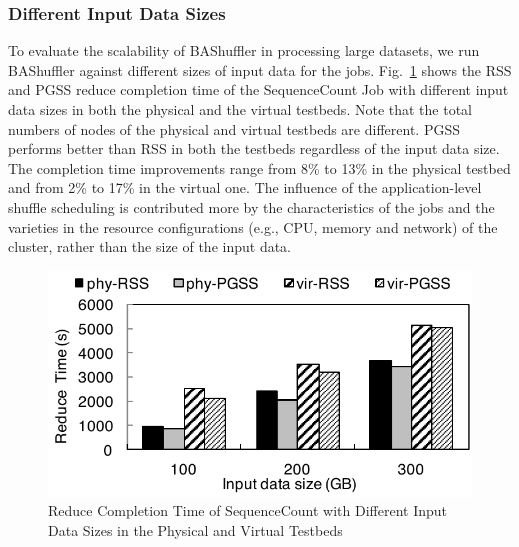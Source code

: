 \documentclass[10pt,journal,compsoc]{IEEEtran}
\begin{document}
\subsubsection{Different Input Data Sizes}
To evaluate the scalability of BAShuffler in processing large datasets, 
we run BAShuffler against different sizes of input data for the jobs.
Fig.~\ref{fig:r_sizes} shows the RSS and PGSS reduce completion time of the
SequenceCount Job with different input data sizes
in both the physical and the virtual testbeds. 
Note that the total numbers of nodes of the physical and virtual testbeds are different.
PGSS performs better than RSS in both the testbeds regardless of the input data size. 
The completion time improvements range from 8\% to 13\% in the physical testbed
and from 2\% to 17\% in the virtual one. 
The influence of the application-level shuffle scheduling is contributed more by 
the characteristics of the jobs and the varieties in the resource configurations
(e.g., CPU, memory and network) of the cluster, rather than the size of the input data. 


\begin{figure}[!t]
\centering
\includegraphics[width=0.8\columnwidth,height=0.4\columnwidth]{figure11}
\caption{Reduce Completion Time of SequenceCount with Different Input Data Sizes in the Physical and Virtual Testbeds}
\label{fig:r_sizes}
\end{figure}
\end{document}
